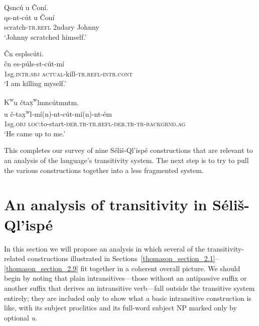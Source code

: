 \documentclass[output=paper,colorlinks,citecolor=brown]{langscibook}
\begin{document}
\ea 
\label{ex-thomason-42}
Qsnc\'u {\textltilde}u \v{C}on\'i. \\
\gll qs-nt-c\'ut {\textltilde}u \v{C}on\'i \\ 
scratch-\textsc{tr.refl} 2ndary Johnny \\
\glt `Johnny scratched himself.'
\z

\ea 
\label{ex-thomason-43}
\v{C}n esplsc\'uti. \\
\gll \v{c}n es-p\'uls-st-c\'ut-m\'i \\
1sg.\textsc{intr.sbj} \textsc{actual}-kill-\textsc{tr.refl-intr.cont} \\
\glt  `I am killing myself.'
\z

\ea 
\label{ex-thomason-44}
{K\textsuperscript w}u \v{c}ta{\d{x}\textsuperscript w}lmnc\'utmntm. \\
u \v{c}-ta{\d{x}\textsuperscript
 w}l-m\'i(n)-nt-c\'ut-m\'i(n)-nt-\'em \\ 
1sg.\textsc{obj} \textsc{loc}:to-start-\textsc{der.tr-tr.refl-der.tr-tr-backgrnd.ag} \\
\glt `He came up to me.'
\z


This completes our survey of nine S\'eli\v{s}-Ql'isp\'e constructions
that are relevant to an analysis of the language's transitivity
system.  The next step is to try to pull the various constructions
together into a less fragmented system.

\section{An analysis of transitivity in S\'eli\v{s}-Ql'isp\'e}  %
\label{thomason_section_3}

In this section we will propose an analysis in which several of the
transitivity-related constructions illustrated in
Sections~\ref{thomason_section_2.1}--\ref{thomason_section_2.9} fit
together in a coherent overall picture.  We should begin by noting
that plain intransitives---those without an antipassive suffix or
another suffix that derives an intransitive verb---fall outside the
transitive system entirely; they are included only to show what a
basic intransitive construction is like, with its subject proclitics
and its full-word subject NP marked only by optional \emph{{\textltilde}u}.
\end{document}
